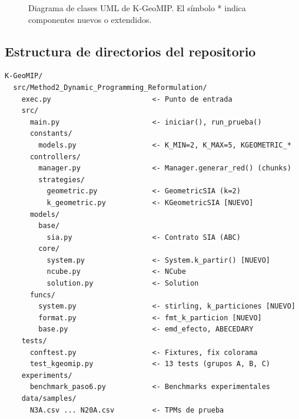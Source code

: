 \documentclass[12pt,letterpaper]{article}
\theoremstyle{definition}
\theoremstyle{remark}
\begin{document}
\begin{figure}[H]
\caption{Diagrama de clases UML de K-GeoMIP.
  El símbolo \textcolor{KGeoOrange}{*} indica componentes nuevos o extendidos.}
\label{fig:clases}
\end{figure}

\subsection{Estructura de directorios del repositorio}

\begin{lstlisting}[style=pseudocode,
  caption={Estructura del repositorio K-GeoMIP (Método 2)},
  label=lst:estructura]
K-GeoMIP/
  src/Method2_Dynamic_Programming_Reformulation/
    exec.py                        <- Punto de entrada
    src/
      main.py                      <- iniciar(), run_prueba()
      constants/
        models.py                  <- K_MIN=2, K_MAX=5, KGEOMETRIC_*
      controllers/
        manager.py                 <- Manager.generar_red() (chunks)
        strategies/
          geometric.py             <- GeometricSIA (k=2)
          k_geometric.py           <- KGeometricSIA [NUEVO]
      models/
        base/
          sia.py                   <- Contrato SIA (ABC)
        core/
          system.py                <- System.k_partir() [NUEVO]
          ncube.py                 <- NCube
          solution.py              <- Solution
      funcs/
        system.py                  <- stirling, k_particiones [NUEVO]
        format.py                  <- fmt_k_particion [NUEVO]
        base.py                    <- emd_efecto, ABECEDARY
    tests/
      conftest.py                  <- Fixtures, fix colorama
      test_kgeomip.py              <- 13 tests (grupos A, B, C)
    experiments/
      benchmark_paso6.py           <- Benchmarks experimentales
    data/samples/
      N3A.csv ... N20A.csv         <- TPMs de prueba
\end{lstlisting}
\end{document}
